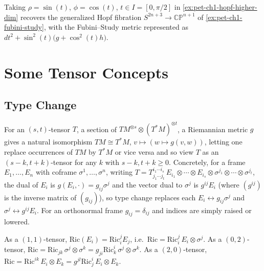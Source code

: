 \begin{example}
  \label{ex:pet-ch1-generalized-hopf}
  \leanok
  Taking $\rho=\sin(t)$, $\phi=\cos(t)$, $t\in I=[0,\pi/2]$ in
  \cref{ex:pet-ch1-hopf-higher-dim} recovers the generalized Hopf fibration
  $S^{2n+3}\to\mathbb{CP}^{n+1}$ of \cref{ex:pet-ch1-fubini-study}, with the
  Fubini--Study metric represented as $dt^2+\sin^2(t)\big(g+\cos^2(t)h\big)$.
\end{example}

\section{Some Tensor Concepts}

\subsection{Type Change}

\begin{definition}
  \label{def:pet-ch1-tensor-type-change}
  \leanok
  For an $(s,t)$-tensor $T$, a section of
  $TM^{\otimes s}\otimes(T^*M)^{\otimes t}$, a Riemannian metric $g$ gives a
  natural isomorphism $TM\cong T^*M$, $v\mapsto(w\mapsto g(v,w))$, letting one
  replace occurrences of $TM$ by $T^*M$ or vice versa and so view $T$ as an
  $(s-k,t+k)$-tensor for any $k$ with $s-k,t+k\ge0$. Concretely, for a frame
  $E_1,\dots,E_n$ with coframe $\sigma^1,\dots,\sigma^n$, writing
  $T=T^{i_1\cdots i_s}_{j_1\cdots j_t}\,E_{i_1}\otimes\cdots\otimes E_{i_s}\otimes
  \sigma^{j_1}\otimes\cdots\otimes\sigma^{j_t}$, the dual of $E_i$ is
  $g(E_i,\cdot)=g_{ij}\sigma^j$ and the vector dual to $\sigma^j$ is $g^{ij}E_i$
  (where $(g^{ij})$ is the inverse matrix of $(g_{ij})$), so type change replaces
  each $E_i\leftrightarrow g_{ij}\sigma^j$ and $\sigma^j\leftrightarrow g^{ij}E_i$.
  For an orthonormal frame $g_{ij}=\delta_{ij}$ and indices are simply raised or
  lowered.
\end{definition}

\begin{notation}
  \label{def:pet-ch1-ricci-types}
  \leanok
  As a $(1,1)$-tensor, $\mathrm{Ric}(E_i)=\mathrm{Ric}^j_iE_j$, i.e.\
  $\mathrm{Ric}=\mathrm{Ric}^j_i\,E_i\otimes\sigma^j$. As a $(0,2)$-tensor,
  $\mathrm{Ric}=\mathrm{Ric}_{jk}\,\sigma^j\otimes\sigma^k=g_{ji}\mathrm{Ric}^i_k\,
  \sigma^j\otimes\sigma^k$. As a $(2,0)$-tensor,
  $\mathrm{Ric}=\mathrm{Ric}^{ik}\,E_i\otimes E_k=g^{jl}\mathrm{Ric}^i_j\,E_i\otimes E_k$.
  \source{petersen:page-0047}
\end{notation}


